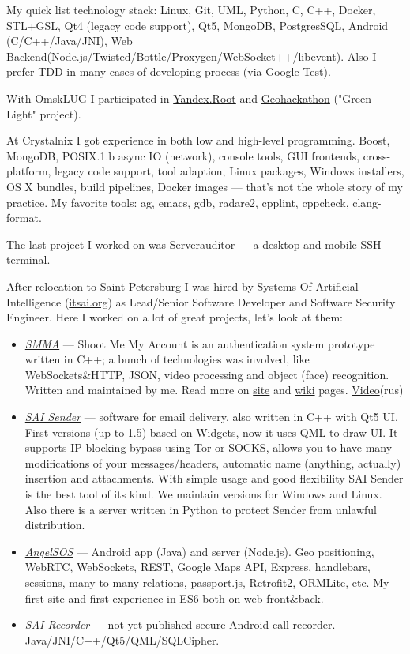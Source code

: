 \documentclass[letterpaper,11pt]{article}
\begin{document}
	My quick list technology stack: Linux, Git, UML, Python, C, C++, Docker, STL+GSL, Qt4 (legacy code support), Qt5, MongoDB, PostgresSQL, Android (C/C++/Java/JNI), Web Backend(Node.js/Twisted/Bottle/Proxygen/WebSocket++/libevent). Also I prefer TDD in many cases of developing process (via Google Test).
	
	With OmskLUG I participated in \href{http://omsklug.com/members/chemtech/activity/759}{Yandex.Root} and \href{https://vk.com/geohackathon}{Geohackathon} ("Green Light" project).
	
	At Crystalnix I got experience in both low and high-level programming. Boost, MongoDB, POSIX.1.b async IO (network), console tools, GUI frontends, cross-platform, legacy code support, tool adaption, Linux packages, Windows installers, OS X bundles, build pipelines, Docker images --- that's not the whole story of my practice. My favorite tools: ag, emacs, gdb, radare2, cpplint, cppcheck, clang-format.
	
	The last project I worked on was \href{http://serverauditor.com/}{Serverauditor} --- a desktop and mobile SSH terminal.
	
	After relocation to Saint Petersburg I was hired by Systems Of Artificial Intelligence (\href{https://itsai.org}{itsai.org}) as Lead/Senior Software Developer and Software Security Engineer.
	Here I worked on a lot of great projects, let's look at them:
	\begin{itemize}
		\item \href{https://smma.pro/}{\emph{SMMA}} --- Shoot Me My Account is an authentication system prototype written in C++; a bunch of technologies was involved, like WebSockets\&HTTP, JSON, video processing and object (face) recognition. Written and maintained by me. Read more on \href{https://smma.pro/}{site} and \href{https://github.com/saicorp/SMMA/wiki}{wiki} pages. \href{https://youtu.be/X2SRc-d5yBA}{Video}(rus)
		\item \href{https://itsai.org/products/view/sai-sender}{\emph{SAI Sender}} --- software for email delivery, also written in C++ with Qt5 UI. First versions (up to 1.5) based on Widgets, now it uses QML to draw UI. It supports IP blocking bypass using Tor or SOCKS, allows you to have many modifications of your messages/headers, automatic name (anything, actually) insertion and attachments. With simple usage and good flexibility SAI Sender is the best tool of its kind. We maintain versions for Windows and Linux. Also there is a server written in Python to protect Sender from unlawful distribution.
		\item \href{https://angelsos.ru/}{\emph{AngelSOS}} --- Android app (Java) and server (Node.js). Geo positioning, WebRTC, WebSockets, REST, Google Maps API, Express, handlebars, sessions, many-to-many relations, passport.js, Retrofit2, ORMLite, etc. My first site and first experience in ES6 both on web front\&back.
		\item \emph{SAI Recorder} --- not yet published secure Android call recorder. Java/JNI/C++/Qt5/QML/SQLCipher.
	\end{itemize}
	
\end{document}
